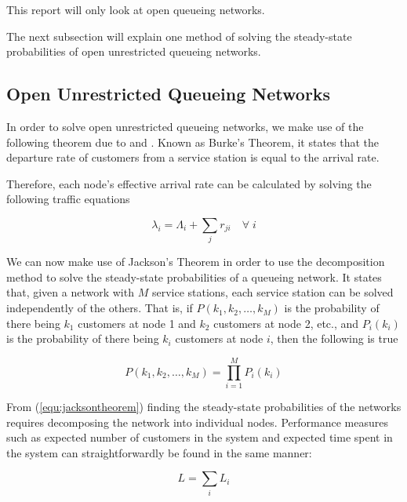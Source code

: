 \documentclass{article}
\begin{document}
This report will only look at open queueing networks.

The next subsection will explain one method of solving the steady-state probabilities of open unrestricted queueing networks.

\subsection{Open Unrestricted Queueing Networks}

In order to solve open unrestricted queueing networks, we make use of the following theorem due to \cite{burke56} and \cite{reich57}.
Known as Burke's Theorem, it states that the departure rate of customers from a service station is equal to the arrival rate.

Therefore, each node's effective arrival rate can be calculated by solving the following traffic equations

\begin{equation}
    \lambda_i = \Lambda_i + \sum_j r_{ji} \quad \forall\; i
\end{equation}

We can now make use of Jackson's Theorem \cite{jackson57} in order to use the decomposition method to solve the steady-state probabilities of a queueing network.
It states that, given a network with $M$ service stations, each service station can be solved independently of the others.
That is, if $P(k_1, k_2, \dotsc, k_M)$ is the probability of there being $k_1$ customers at node 1 and $k_2$ customers at node 2, etc., and $P_i(k_i)$ is the probability of there being $k_i$ customers at node $i$, then the following is true

\begin{equation}
    P(k_1, k_2, \dotsc, k_M) = \prod_{i=1}^M P_i(k_i)
    \label{equ:jacksontheorem}
\end{equation}

From (\ref{equ:jacksontheorem}) finding the steady-state probabilities of the networks requires decomposing the network into individual nodes.
Performance measures such as expected number of customers in the system and expected time spent in the system can straightforwardly be found in the same manner:

\begin{equation}
    L = \sum_i L_i
\end{equation}
\end{document}
